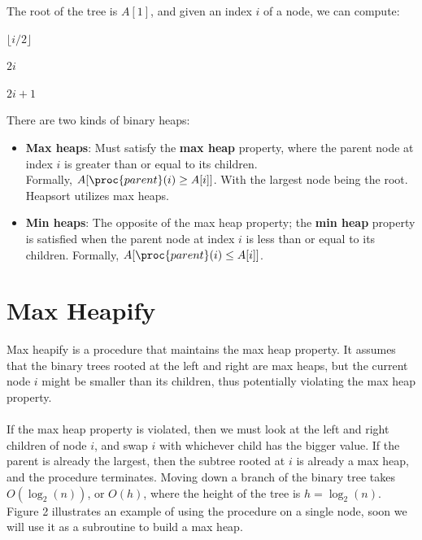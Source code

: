 \documentclass[12pt]{article}
\begin{document}
The root of the tree is $A[1]$, and given an index $i$ of a node, we can compute:
\begin{codebox}
\li \Return $\lfloor i/2 \rfloor$
\end{codebox}

\begin{codebox}
\li \Return $2i$
\end{codebox}

\begin{codebox}
\li \Return $2i + 1$
\end{codebox}

There are two kinds of binary heaps:
\begin{itemize}
    \item \textbf{Max heaps}: Must satisfy the \textbf{max heap} property, where the parent node at index $i$ is greater than or equal to its children. \\Formally, $A[\proc{parent}(i) \geq A[i]]$. With the largest node being the root. Heapsort utilizes max heaps.
    \\
    \item \textbf{Min heaps}: The opposite of the max heap property; the \textbf{min heap} property is satisfied when the parent node at index $i$ is less than or equal to its children. Formally, $A[\proc{parent}(i) \leq A[i]]$.
\end{itemize}

\section*{Max Heapify}
Max heapify is a procedure that maintains the max heap property. It assumes that the binary trees rooted at the left and right are max heaps, but the current node $i$ might be smaller than its children, thus potentially violating the max heap property.
\\ \\
If the max heap property is violated, then we must look at the left and right children of node $i$, and swap $i$ with whichever child has the bigger value. If the parent is already the largest, then the subtree rooted at $i$ is already a max heap, and the procedure terminates. Moving down a branch of the binary tree takes $O(\log_2{(n)})$, or $O(h)$, where the height of the tree is $ h = \log_2{(n)}$. Figure 2 illustrates an example of using the procedure on a single node, soon we will use it as a subroutine to build a max heap.
\end{document}
